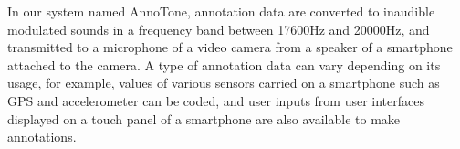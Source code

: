 In our system named AnnoTone, annotation data are converted to inaudible modulated sounds in a frequency band between 17600Hz and 20000Hz, and transmitted to a microphone of a video camera from a speaker of a smartphone attached to the camera.
A type of annotation data can vary depending on its usage, for example, values of various sensors carried on a smartphone such as GPS and accelerometer can be coded, and user inputs from user interfaces displayed on a touch panel of a smartphone are also available to make annotations.
